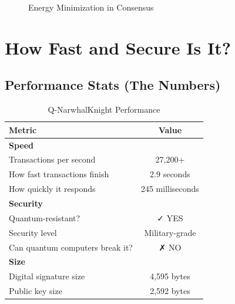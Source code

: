 \documentclass[11pt,a4paper]{article}
\begin{document}
\begin{figure}[H]
\centering
{}
\caption{Energy Minimization in Consensus}
\end{figure}

\section{How Fast and Secure Is It?}

\subsection{Performance Stats (The Numbers)}

\begin{table}[H]
\centering
\large
\caption{Q-NarwhalKnight Performance}
\begin{tabular}{|l|c|}
\hline
\textbf{Metric} & \textbf{Value} \\
\hline
\textbf{Speed} & \\
Transactions per second & 27,200+ \\
How fast transactions finish & 2.9 seconds \\
How quickly it responds & 245 milliseconds \\
\hline
\textbf{Security} & \\
Quantum-resistant? & ✓ YES \\
Security level & Military-grade \\
Can quantum computers break it? & ✗ NO \\
\hline
\textbf{Size} & \\
Digital signature size & 4,595 bytes \\
Public key size & 2,592 bytes \\
\hline
\end{tabular}
\end{table}
\end{document}
